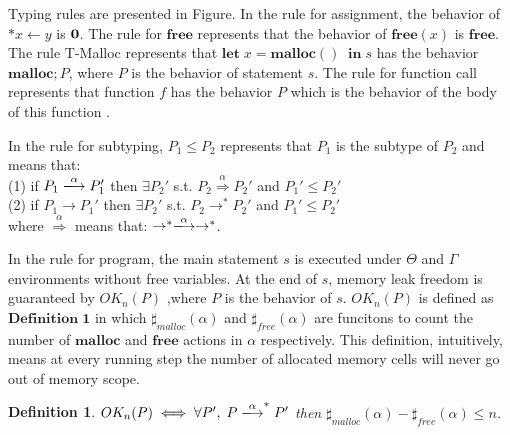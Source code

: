 \documentclass[english]{jssst_ppl} %
\newcommand\LET{\mathbf{let}\;}
\newcommand\IN{\mathbf{in}\;}
\newcommand\MALLOC{\mathbf{malloc()}\;}
\newcommand\Malloc{\mathbf{malloc}}
\newcommand\Free{\mathbf{free}}
\newcommand\Cirx{(x)}
\newtheorem{myDef}{Definition}
\begin{document}
Typing rules are presented in Figure. In the rule for assignment, the behavior of  $*x \leftarrow y$ is $\bf 0$. The rule for $\Free$ represents that the behavior of $\Free \Cirx$ is $\Free$. The rule T-Malloc represents that $\LET x = \MALLOC \; \IN s$ has the behavior $\Malloc;P$, where $P$ is the behavior of statement $s$. The rule for function call represents that function $f$ has the behavior $P$ which is the behavior of the body of this function .

In the rule for subtyping, $P_{1} \le P_{2}$ represents that $P_{1}$ is the subtype of $P_{2}$ and  means that: \\
(1) if $P_{1} \xlongrightarrow{\alpha}  P_{1}'$ then $\exists P_{2}' $ s.t. $P_{2} \overset{\text{$\alpha$}}{\Longrightarrow} P_{2}'$ and $ P_{1}' \le P_{2}' $\\
(2) if $P_{1} \rightarrow P_{1}'$ then $\exists P_{2}'$ s.t. $P_{2} \rightarrow^{*} P_{2}'$ and  $P_{1}' \le P_{2}'$\\
where $\overset{\text{$\alpha$}}{\Longrightarrow}$ means that: $\rightarrow^{*} \xlongrightarrow{\alpha} \rightarrow^{*}$.

In the rule for program, the main statement $s$ is executed under $\Theta$ and $\Gamma$ environments without free variables. At the end of $s$, memory leak freedom is guaranteed by $OK_{n}(P)$ ,where $P$ is the behavior of $s$. $OK_{n}(P)$ is defined as $\mathbf{Definition\; 1}$ in which $\sharp_{malloc}(\alpha)$ and $\sharp_{free}(\alpha)$ are funcitons to count the number of $\Malloc$ and $\Free$ actions in $\alpha$ respectively. This definition, intuitively, means at every running step the number of allocated memory cells will never go out of memory scope.
\begin{myDef}
 $OK_{n}(P) \iff \forall P',\; P \xlongrightarrow{\alpha}^{*}P'$ then $\sharp_{malloc}(\alpha)-\sharp_{free}(\alpha)\le n$.
\end{myDef}
\end{document}
